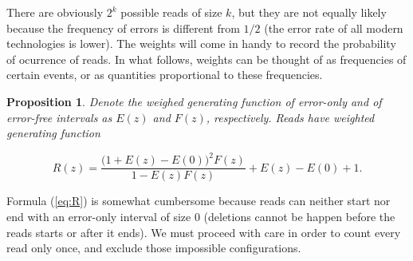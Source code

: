 \documentclass{article}
\newtheorem{proposition}{Proposition}
\begin{document}
There are obviously $2^k$ possible reads of size $k$, but they are not
equally likely because the frequency of errors is different from $1/2$
(the error rate of all modern technologies is lower). The weights will
come in handy to record the probability of ocurrence of reads. In what
follows, weights can be thought of as frequencies of certain events, or as
quantities proportional to these frequencies.

\begin{proposition}
\label{th:R}
Denote the weighed generating function of error-only and of error-free
intervals as $E(z)$ and $F(z)$, respectively. Reads have weighted
generating function

\begin{equation}
\label{eq:R}
R(z) = \frac{\big(1+E(z)-E(0)\big)^2F(z)}{1-E(z)F(z)} + E(z)-E(0)+1.
\end{equation}
\end{proposition}

Formula (\ref{eq:R}) is somewhat cumbersome because reads can neither
start nor end with an error-only interval of size $0$ (deletions cannot be
happen before the reads starts or after it ends). We must proceed with
care in order to count every read only once, and exclude those impossible
configurations.
\end{document}
